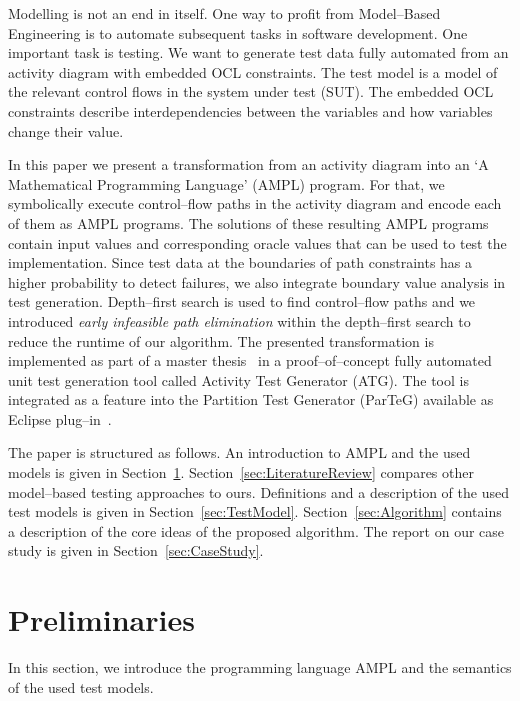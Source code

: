 \documentclass[runningheads,a4paper]{llncs}%
\begin{document}
Modelling is not an end in itself.
One way to profit from Model--Based Engineering is to automate subsequent tasks
in software development. One important task is testing. We want to generate test
data fully automated from an activity diagram with embedded OCL constraints. The
test model is a model of the relevant control flows in the system under test
(SUT). The embedded OCL constraints describe interdependencies between the
variables and how variables change their value.

In this paper we present a transformation from an activity diagram into an `A
Mathematical Programming Language' (AMPL) program. For that, we symbolically
execute control--flow paths in the activity diagram and encode each of them as
AMPL programs. The solutions of these resulting AMPL programs contain input
values and corresponding oracle values that can be used to test the
implementation. Since test data at the boundaries of path constraints has a
higher probability to detect failures, we also integrate boundary value analysis
in test generation. Depth--first search is used to find control--flow paths and
we introduced \emph{early infeasible path elimination} within the depth--first
search to reduce the runtime of our algorithm. The presented transformation is
implemented as part of a master thesis~\cite{Kurth2014AutomatedGen} in a
proof--of--concept fully automated unit test generation tool called Activity
Test Generator (ATG). The tool is integrated as a feature into the Partition
Test Generator (ParTeG) available as Eclipse plug--in~\cite{PartegWebsite}.

The paper is structured as follows. An introduction to AMPL and the used models
is given in Section~\ref{sec:Preliminaries}. Section~\ref{sec:LiteratureReview}
compares other model--based testing approaches to ours. Definitions and a
description of the used test models is given in Section~\ref{sec:TestModel}.
Section~\ref{sec:Algorithm} contains a description of the core ideas of the
proposed algorithm. The report on our case study is given in
Section~\ref{sec:CaseStudy}.%

\section{Preliminaries}%
\label{sec:Preliminaries}%

In this section, we introduce the programming language AMPL and the semantics of
the used test models.
\end{document}
